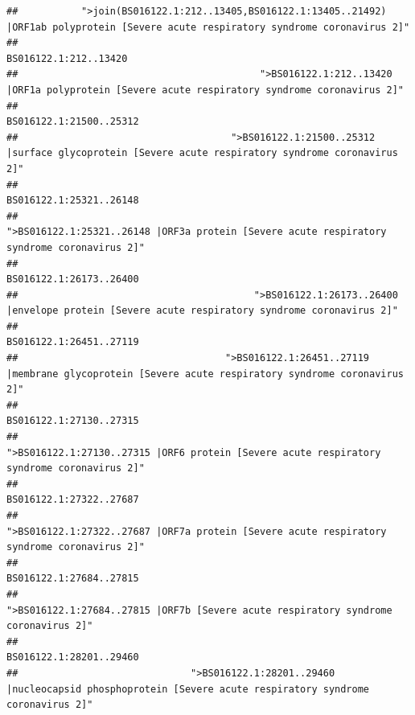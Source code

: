 \documentclass[
]{article}
\begin{document}
\begin{verbatim}
##           ">join(BS016122.1:212..13405,BS016122.1:13405..21492) |ORF1ab polyprotein [Severe acute respiratory syndrome coronavirus 2]" 
##                                                                                                                  BS016122.1:212..13420 
##                                          ">BS016122.1:212..13420 |ORF1a polyprotein [Severe acute respiratory syndrome coronavirus 2]" 
##                                                                                                                BS016122.1:21500..25312 
##                                     ">BS016122.1:21500..25312 |surface glycoprotein [Severe acute respiratory syndrome coronavirus 2]" 
##                                                                                                                BS016122.1:25321..26148 
##                                            ">BS016122.1:25321..26148 |ORF3a protein [Severe acute respiratory syndrome coronavirus 2]" 
##                                                                                                                BS016122.1:26173..26400 
##                                         ">BS016122.1:26173..26400 |envelope protein [Severe acute respiratory syndrome coronavirus 2]" 
##                                                                                                                BS016122.1:26451..27119 
##                                    ">BS016122.1:26451..27119 |membrane glycoprotein [Severe acute respiratory syndrome coronavirus 2]" 
##                                                                                                                BS016122.1:27130..27315 
##                                             ">BS016122.1:27130..27315 |ORF6 protein [Severe acute respiratory syndrome coronavirus 2]" 
##                                                                                                                BS016122.1:27322..27687 
##                                            ">BS016122.1:27322..27687 |ORF7a protein [Severe acute respiratory syndrome coronavirus 2]" 
##                                                                                                                BS016122.1:27684..27815 
##                                                    ">BS016122.1:27684..27815 |ORF7b [Severe acute respiratory syndrome coronavirus 2]" 
##                                                                                                                BS016122.1:28201..29460 
##                              ">BS016122.1:28201..29460 |nucleocapsid phosphoprotein [Severe acute respiratory syndrome coronavirus 2]" 

\end{verbatim}
\end{document}
